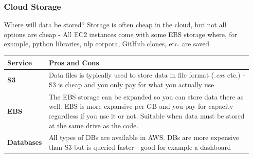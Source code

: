 \documentclass[aspectratio=169]{beamer} %
\begin{document}
\begin{frame}
	\frametitle{Cloud Storage}
	
		Where will data be stored? Storage is often cheap in the cloud, but not all options are cheap - All EC2 instances come with some EBS storage where, for example, python libraries, nlp corpora,  GitHub clones, etc. are saved
		\vspace{-.5cm}
			\begin{table}
			\begin{tabular}{p{}p{}}
				Service & Pros and Cons\\
				\hline \hline
				\textbf{S3} & Data files is typically used to store data in file format (\textit{.csv} etc.) - S3 is cheap and you only pay for what you actually use \\[.2cm] 
				\textbf{EBS} & The EBS storage can be expanded so you can store data there as well. EBS is more expansive per GB and you pay for capacity regardless if you use it or not. Suitable when data must be stored at the same drive as the code.  \\[.2cm]
				\textbf{Databases} & All types of DBs are available in AWS. DBs are more expensive than S3 but is queried faster - good for example a dashboard								
			\end{tabular}
		\end{table}

\end{frame}
\end{document}
